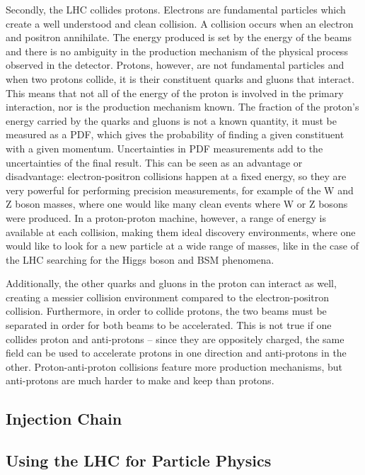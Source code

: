 Secondly, the \ac{LHC} collides protons. Electrons are fundamental particles which create a well understood and clean collision. A collision occurs when an electron and positron annihilate. The energy produced is set by the energy of the beams and there is no ambiguity in the production mechanism of the physical process observed in the detector. Protons, however, are not fundamental particles and when two protons collide, it is their constituent quarks and gluons that interact. This means that not all of the energy of the proton is involved in the primary interaction, nor is the production mechanism known. The fraction of the proton's energy carried by the quarks and gluons is not a known quantity, it must be measured as a \ac{PDF}, which gives the probability of finding a given constituent with a given momentum. Uncertainties in \ac{PDF} measurements add to the uncertainties of the final result. This can be seen as an advantage or disadvantage: electron-positron collisions happen at a fixed energy, so they are very powerful for performing precision measurements, for example of the W and Z boson masses, where one would like many clean events where W or Z bosons were produced. In a proton-proton machine, however, a range of energy is available at each collision, making them ideal discovery environments, where one would like to look for a new particle at a wide range of masses, like in the case of the \ac{LHC} searching for the Higgs boson and \ac{BSM} phenomena. 

Additionally, the other quarks and gluons in the proton can interact as well, creating a messier collision environment compared to the electron-positron collision. Furthermore, in order to collide protons, the two beams must be separated in order for both beams to be accelerated. This is not true if one collides proton and anti-protons -- since they are oppositely charged, the same field can be used to accelerate protons in one direction and anti-protons in the other. Proton-anti-proton collisions feature more production mechanisms, but anti-protons are much harder to make and keep than protons. 







\subsection{Injection Chain}



\subsection{Using the LHC for Particle Physics}

